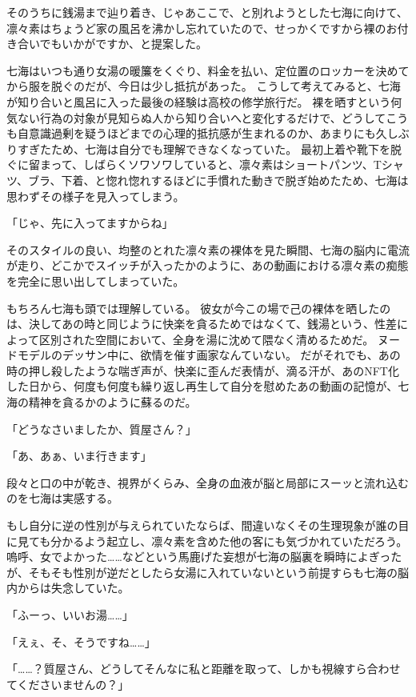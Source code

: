そのうちに銭湯まで辿り着き、じゃあここで、と別れようとした七海に向けて、凛々素はちょうど家の風呂を沸かし忘れていたので、せっかくですから裸のお付き合いでもいかがですか、と提案した。

七海はいつも通り女湯の暖簾をくぐり、料金を払い、定位置のロッカーを決めてから服を脱ぐのだが、今日は少し抵抗があった。
こうして考えてみると、七海が知り合いと風呂に入った最後の経験は高校の修学旅行だ。
裸を晒すという何気ない行為の対象が見知らぬ人から知り合いへと変化するだけで、どうしてこうも自意識過剰を疑うほどまでの心理的抵抗感が生まれるのか、あまりにも久しぶりすぎたため、七海は自分でも理解できなくなっていた。
最初上着や靴下を脱ぐに留まって、しばらくソワソワしていると、凛々素はショートパンツ、Tシャツ、ブラ、下着、と惚れ惚れするほどに手慣れた動きで脱ぎ始めたため、七海は思わずその様子を見入ってしまう。

「じゃ、先に入ってますからね」

そのスタイルの良い、均整のとれた凛々素の裸体を見た瞬間、七海の脳内に電流が走り、どこかでスイッチが入ったかのように、あの動画における凛々素の痴態を完全に思い出してしまっていた。

もちろん七海も頭では理解している。
彼女が今この場で己の裸体を晒したのは、決してあの時と同じように快楽を貪るためではなくて、銭湯という、性差によって区別された空間において、全身を湯に沈めて隈なく清めるためだ。
ヌードモデルのデッサン中に、欲情を催す画家なんていない。
だがそれでも、あの時の押し殺したような喘ぎ声が、快楽に歪んだ表情が、滴る汗が、あのNFT化した日から、何度も何度も繰り返し再生して自分を慰めたあの動画の記憶が、七海の精神を貪るかのように蘇るのだ。

「どうなさいましたか、質屋さん？」

「あ、あぁ、いま行きます」

段々と口の中が乾き、視界がくらみ、全身の血液が脳と局部にスーッと流れ込むのを七海は実感する。

もし自分に逆の性別が与えられていたならば、間違いなくその生理現象が誰の目に見ても分かるよう起立し、凛々素を含めた他の客にも気づかれていただろう。嗚呼、女でよかった……などという馬鹿げた妄想が七海の脳裏を瞬時によぎったが、そもそも性別が逆だとしたら女湯に入れていないという前提すらも七海の脳内からは失念していた。

\sectionbreak

「ふーっ、いいお湯……」

「えぇ、そ、そうですね……」

「……？質屋さん、どうしてそんなに私と距離を取って、しかも視線すら合わせてくださいませんの？」

